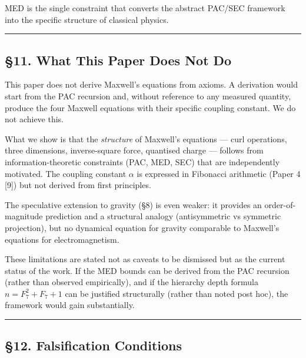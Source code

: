 \documentclass[
  11pt,
  a4paper]{article}
\begin{document}
MED is the single constraint that converts the abstract PAC/SEC
framework into the specific structure of classical physics.

\begin{center}\rule{0.5\linewidth}{0.5pt}\end{center}

\subsection{§11. What This Paper Does Not
Do}\label{what-this-paper-does-not-do}

This paper does not derive Maxwell's equations from axioms. A derivation
would start from the PAC recursion and, without reference to any
measured quantity, produce the four Maxwell equations with their
specific coupling constant. We do not achieve this.

What we show is that the \emph{structure} of Maxwell's equations ---
curl operations, three dimensions, inverse-square force, quantised
charge --- follows from information-theoretic constraints (PAC, MED,
SEC) that are independently motivated. The coupling constant \(\alpha\)
is expressed in Fibonacci arithmetic (Paper 4 {[}9{]}) but not derived
from first principles.

The speculative extension to gravity (§8) is even weaker: it provides an
order-of-magnitude prediction and a structural analogy (antisymmetric vs
symmetric projection), but no dynamical equation for gravity comparable
to Maxwell's equations for electromagnetism.

These limitations are stated not as caveats to be dismissed but as the
current status of the work. If the MED bounds can be derived from the
PAC recursion (rather than observed empirically), and if the hierarchy
depth formula \(n = F_7^2 + F_7 + 1\) can be justified structurally
(rather than noted post hoc), the framework would gain substantially.

\begin{center}\rule{0.5\linewidth}{0.5pt}\end{center}

\subsection{§12. Falsification
Conditions}\label{falsification-conditions}
\end{document}
